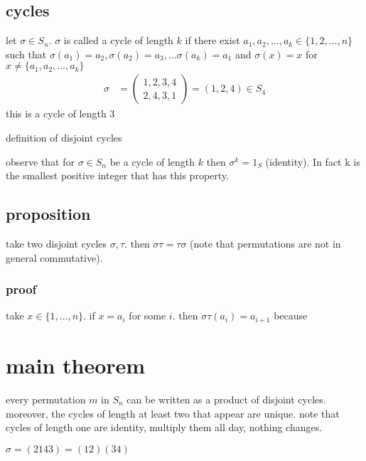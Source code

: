 \documentclass[letterpaper]{article}
\begin{document}
\subsection*{cycles}
let $\sigma\in S_n$. $\sigma$ is called a cycle of length $k$ if there exist $a_1,a_2,\dots,a_k\in\{1,2,\dots,n\}$ such that $\sigma(a_1)=a_2,\sigma(a_2)=a_3,\dots\sigma(a_k)=a_1$ and $\sigma(x)=x$ for $x\ne\{a_1,a_2,\dots,a_k\}$
\begin{align*}
    \sigma&=\left(\begin{aligned}
      1,2,3,4\\
      2,4,3,1
    \end{aligned}\right)=(1,2,4)\in S_4
\end{align*}
this is a cycle of length 3

definition of disjoint cycles

observe that for $\sigma\in S_n$ be a cycle of length $k$ then $\sigma^k=1_S$ (identity). In fact k is the smallest positive integer that has this property. 

\subsection*{proposition}
take two disjoint cycles $\sigma,\tau$. then $\sigma\tau=\tau\sigma$ (note that permutations are not in general commutative). 

\subsubsection*{proof}
take $x\in\{1,\dots,n\}$. if $x=a_i$ for some $i$. then $\sigma\tau(a_i)=a_{i+1}$ because 

\section*{main theorem}
every permutation $m$ in $S_n$ can be written as a product of disjoint cycles. moreover, the cycles of length at least two that appear are unique. note that cycles of length one are identity, multiply them all day, nothing changes.

$\sigma=(2143)=(12)(34)$
\end{document}
